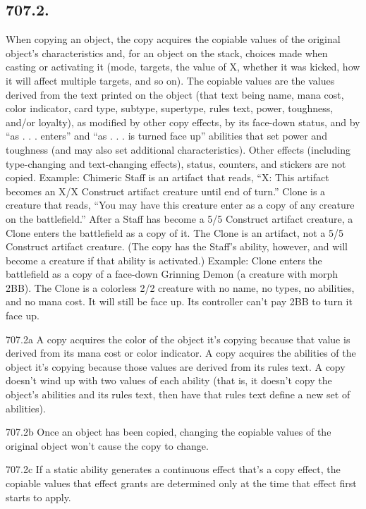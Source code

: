 \subsection*{707.2.}
When copying an object, the copy acquires the copiable values of the original object’s characteristics and, for an object on the stack, choices made when casting or activating it (mode, targets, the value of X, whether it was kicked, how it will affect multiple targets, and so on). The copiable values are the values derived from the text printed on the object (that text being name, mana cost, color indicator, card type, subtype, supertype, rules text, power, toughness, and/or loyalty), as modified by other copy effects, by its face-down status, and by “as . . . enters” and “as . . . is turned face up” abilities that set power and toughness (and may also set additional characteristics). Other effects (including type-changing and text-changing effects), status, counters, and stickers are not copied.
Example: Chimeric Staff is an artifact that reads, “{X}: This artifact becomes an X/X Construct artifact creature until end of turn.” Clone is a creature that reads, “You may have this creature enter as a copy of any creature on the battlefield.” After a Staff has become a 5/5 Construct artifact creature, a Clone enters the battlefield as a copy of it. The Clone is an artifact, not a 5/5 Construct artifact creature. (The copy has the Staff’s ability, however, and will become a creature if that ability is activated.)
Example: Clone enters the battlefield as a copy of a face-down Grinning Demon (a creature with morph {2}{B}{B}). The Clone is a colorless 2/2 creature with no name, no types, no abilities, and no mana cost. It will still be face up. Its controller can’t pay {2}{B}{B} to turn it face up.

707.2a A copy acquires the color of the object it’s copying because that value is derived from its mana cost or color indicator. A copy acquires the abilities of the object it’s copying because those values are derived from its rules text. A copy doesn’t wind up with two values of each ability (that is, it doesn’t copy the object’s abilities and its rules text, then have that rules text define a new set of abilities).

707.2b Once an object has been copied, changing the copiable values of the original object won’t cause the copy to change.

707.2c If a static ability generates a continuous effect that’s a copy effect, the copiable values that effect grants are determined only at the time that effect first starts to apply.

